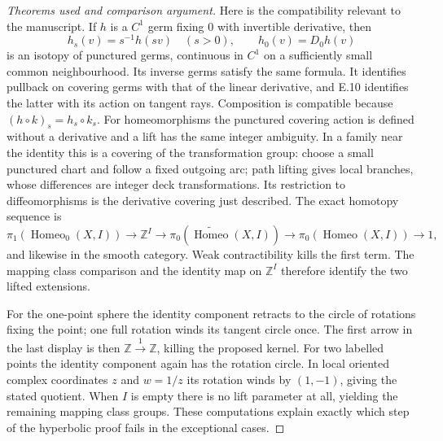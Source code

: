 \begin{proof}[Theorems used and comparison argument]
Here is the compatibility relevant to the manuscript.  If $h$ is a
$C^1$ germ fixing $0$ with invertible derivative, then
\[
 h_s(v)=s^{-1}h(sv)\quad(s>0),\qquad h_0(v)=D_0h(v)
\]
is an isotopy of punctured germs, continuous in $C^1$ on a sufficiently
small common neighbourhood.  Its inverse germs satisfy the same
formula.  It identifies pullback on covering germs with that of the
linear derivative, and E.10 identifies the latter with its action
on tangent rays.  Composition is compatible because
$(h\circ k)_s=h_s\circ k_s$.
For homeomorphisms the punctured covering action is defined without
a derivative and a lift has the same integer ambiguity.  In a family
near the identity this is a covering of the transformation group:
choose a small punctured chart and follow a fixed outgoing arc;
path lifting gives local branches, whose differences are integer
deck transformations.  Its restriction to diffeomorphisms is the
derivative covering just described.  The exact homotopy sequence is
\[
 \pi_1(\operatorname{Homeo}_0(X,I))\longrightarrow\mathbb Z^I
 \longrightarrow\pi_0(\widetilde{\operatorname{Homeo}}(X,I))
 \longrightarrow\pi_0(\operatorname{Homeo}(X,I))\to1,
\]
and likewise in the smooth category.  Weak contractibility kills
the first term.  The mapping class comparison and the identity map
on $\mathbb Z^I$ therefore identify the two lifted extensions.

For the one-point sphere the identity component retracts to the
circle of rotations fixing the point; one full rotation winds its
tangent circle once.  The first arrow in the last display is then
$\mathbb Z\xrightarrow{1}\mathbb Z$, killing the proposed kernel.
For two labelled points the identity component again has the rotation
circle.  In local oriented complex coordinates $z$ and $w=1/z$ its
rotation winds by $(1,-1)$, giving the stated quotient.  When $I$ is
empty there is no lift parameter at all, yielding the remaining
mapping class groups.  These computations explain exactly which
step of the hyperbolic proof fails in the exceptional cases.
\end{proof}

